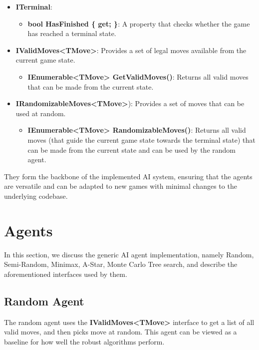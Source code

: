 \begin{itemize}
    \item \textbf{ITerminal}:
        \begin{itemize}
            \item \textbf{bool HasFinished \{ get; \}}: A property that checks whether the game has reached a terminal state.
        \end{itemize}

    \item \textbf{IValidMoves\textless{}TMove\textgreater{}}: Provides a set of legal moves available from the current game state.
        \begin{itemize}
            \item \textbf{IEnumerable\textless{}TMove\textgreater{} GetValidMoves()}: Returns all valid moves that can be made from the current state.
        \end{itemize}

    \item \textbf{IRandomizableMoves\textless{}TMove\textgreater{}}): Provides a set of moves that can be used at random.
        \begin{itemize}
            \item \textbf{IEnumerable\textless{}TMove\textgreater{} RandomizableMoves()}: Returns all valid moves (that guide the current game state towards the terminal state) that can be made from the current state and can be used by the random agent.
        \end{itemize}
\end{itemize}

They form the backbone of the implemented \ac{AI} system, ensuring that the agents are versatile and can be adapted to new games with minimal changes to the underlying codebase.

\section{Agents}

In this section, we discuss the generic \ac{AI} agent implementation, namely Random, Semi-Random, Minimax, A-Star, Monte Carlo Tree search, and describe the aforementioned interfaces used by them.

\subsection{Random Agent}

The random agent uses the \textbf{IValidMoves\textless{}TMove\textgreater{}} interface to get a list of all valid moves, and then picks move at random. This agent can be viewed as a baseline for how well the robust algorithms perform.

